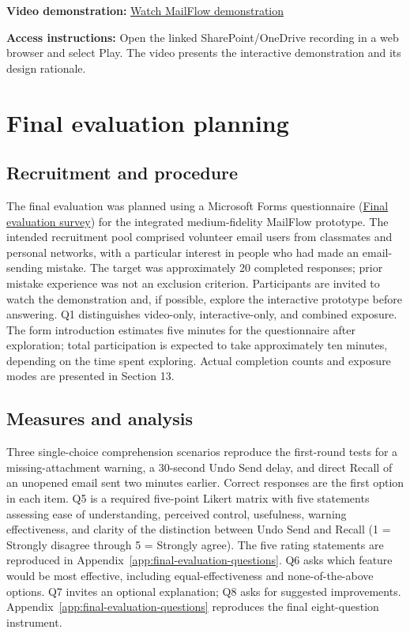 \documentclass[letterpaper]{jdf}
\begin{document}
\noindent\textbf{Video demonstration:} \href{https://gtvault-my.sharepoint.com/:v:/g/personal/zzheng399_gatech_edu/IQCoDjijGlvxSLOoSAevYqpdAXLGodNvVcylA2DDLUJvwW8}{Watch MailFlow demonstration}

\noindent\textbf{Access instructions:} Open the linked SharePoint/OneDrive recording in a web browser and select Play. The video presents the interactive demonstration and its design rationale.

\section{Final evaluation planning}
\subsection{Recruitment and procedure}
The final evaluation was planned using a Microsoft Forms questionnaire (\href{https://forms.cloud.microsoft/Pages/ResponsePage.aspx?id=u5ghSHuuJUuLem1_Mvqgg7vYf6y_H89LjQflMz5FAJxUMU1XRTg2VjhWTFM1MEtaUVUySEZWWUxEMC4u}{Final evaluation survey}) for the integrated medium-fidelity MailFlow prototype. The intended recruitment pool comprised volunteer email users from classmates and personal networks, with a particular interest in people who had made an email-sending mistake. The target was approximately 20 completed responses; prior mistake experience was not an exclusion criterion. Participants are invited to watch the demonstration and, if possible, explore the interactive prototype before answering. Q1 distinguishes video-only, interactive-only, and combined exposure. The form introduction estimates five minutes for the questionnaire after exploration; total participation is expected to take approximately ten minutes, depending on the time spent exploring. Actual completion counts and exposure modes are presented in Section 13.

\subsection{Measures and analysis}
Three single-choice comprehension scenarios reproduce the first-round tests for a missing-attachment warning, a 30-second Undo Send delay, and direct Recall of an unopened email sent two minutes earlier. Correct responses are the first option in each item. Q5 is a required five-point Likert matrix with five statements assessing ease of understanding, perceived control, usefulness, warning effectiveness, and clarity of the distinction between Undo Send and Recall (1 = Strongly disagree through 5 = Strongly agree). The five rating statements are reproduced in Appendix~\ref{app:final-evaluation-questions}. Q6 asks which feature would be most effective, including equal-effectiveness and none-of-the-above options. Q7 invites an optional explanation; Q8 asks for suggested improvements. Appendix~\ref{app:final-evaluation-questions} reproduces the final eight-question instrument.
\end{document}
